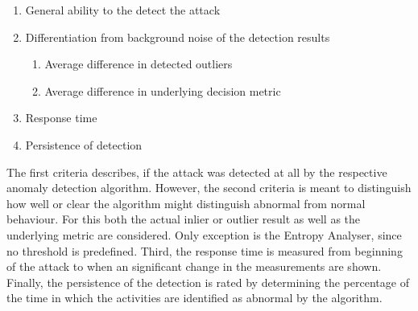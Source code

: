 \begin{enumerate}
	\item General ability to the detect the attack
	\item Differentiation from background noise of the detection results
		\begin{enumerate}
			\item Average difference in detected outliers
			\item Average difference in underlying decision metric
		\end{enumerate}
	\item Response time 
	\item Persistence of detection
\end{enumerate}

The first criteria describes, if the attack was detected at all by the respective anomaly detection algorithm.
However, the second criteria is meant to distinguish how well or clear the algorithm might distinguish abnormal from normal behaviour. For this both the actual inlier or outlier result as well as the underlying metric are considered. Only exception is the Entropy Analyser, since no threshold is predefined.
Third, the response time is measured from beginning of the attack to when an significant change in the measurements are shown.
Finally, the persistence of the detection is rated by determining the percentage of the time in which the activities are identified as abnormal by the algorithm.


\begin{comment}
Angriffe:

DoS
	Kurzschluss im Bus -> DoS auf gesamtem Segment
	A_Restart-Pakete -> DoS gegen einzelne Teilnehmer
Replay-Angriffe
	Zeit mitschneiden -> wiedergeben
	Tag mitschneiden, komprimiert wiedergeben
Manipulation von Paketen (Payload tauschen)
Konfiguration manipulieren
Überwindung von Linienkopplern
Address-Spoofing
	falsche Adresse in Liniensegment
	mit existierender Adresse senden
Netzanalyse mit knxMap (https://github.com/takeshixx/knxmap)
Mitlesen und sofort gegenteilige Aktion auslösen
High-Level-Angriffe:
	nur best. Aktionen zulassen
	Provokation/Sabotage von menschl. Verhalten
Social-Engineering -> Einschleusen von Geräten
\end{comment}